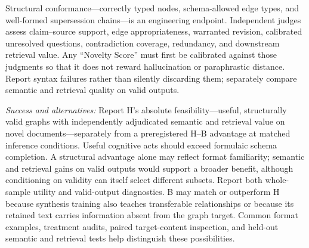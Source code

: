 \documentclass[11pt]{article}
\begin{document}
Structural conformance---correctly typed nodes, schema-allowed edge types, and
well-formed supersession chains---is an engineering endpoint. Independent
judges assess claim--source support, edge appropriateness, warranted revision,
calibrated unresolved questions, contradiction coverage, redundancy, and
downstream retrieval value. Any ``Novelty Score'' must first be calibrated
against those judgments so that it does not reward hallucination or
paraphrastic distance. Report syntax failures rather than silently discarding
them; separately compare semantic and retrieval quality on valid outputs.

\emph{Success and alternatives:} Report H's absolute feasibility---useful,
structurally valid graphs with independently adjudicated semantic and retrieval
value on novel documents---separately from a preregistered H--B advantage at
matched inference conditions. Useful cognitive acts should exceed formulaic
schema completion. A structural advantage alone may reflect format familiarity;
semantic and retrieval gains on valid outputs would support a broader benefit,
although conditioning on validity can itself select different subsets. Report
both whole-sample utility and valid-output diagnostics. B may match or outperform
H because synthesis training also teaches transferable relationships or because
its retained text carries information absent from the graph target.
Common format examples, treatment audits,
paired target-content inspection, and held-out semantic and retrieval tests
help distinguish these possibilities.
\end{document}
